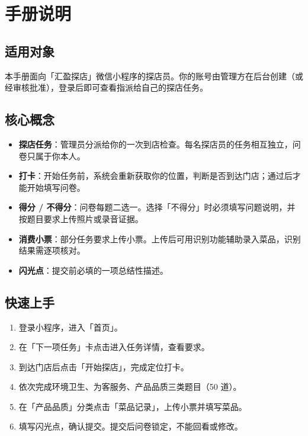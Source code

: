\documentclass[12pt,a4paper,fontset=none]{ctexart}
\begin{document}

\tableofcontents
\newpage

\section{手册说明}

\subsection{适用对象}
本手册面向「汇盈探店」微信小程序的探店员。你的账号由管理方在后台创建（或经审核批准），登录后即可查看指派给自己的探店任务。

\subsection{核心概念}
\begin{itemize}
\item \textbf{探店任务}：管理员分派给你的一次到店检查。每名探店员的任务相互独立，问卷只属于你本人。
\item \textbf{打卡}：开始任务前，系统会重新获取你的位置，判断是否到达门店；通过后才能开始填写问卷。
\item \textbf{得分 / 不得分}：问卷每题二选一。选择「不得分」时必须填写问题说明，并按题目要求上传照片或录音证据。
\item \textbf{消费小票}：部分任务要求上传小票。上传后可用识别功能辅助录入菜品，识别结果需逐项核对。
\item \textbf{闪光点}：提交前必填的一项总结性描述。
\end{itemize}

\subsection{快速上手}
\begin{enumerate}
\item 登录小程序，进入「首页」。
\item 在「下一项任务」卡点击进入任务详情，查看要求。
\item 到达门店后点击「开始探店」，完成定位打卡。
\item 依次完成环境卫生、为客服务、产品品质三类题目（50 道）。
\item 在「产品品质」分类点击「菜品记录」，上传小票并填写菜品。
\item 填写闪光点，确认提交。提交后问卷锁定，不能回看或修改。
\end{enumerate}
\end{document}
